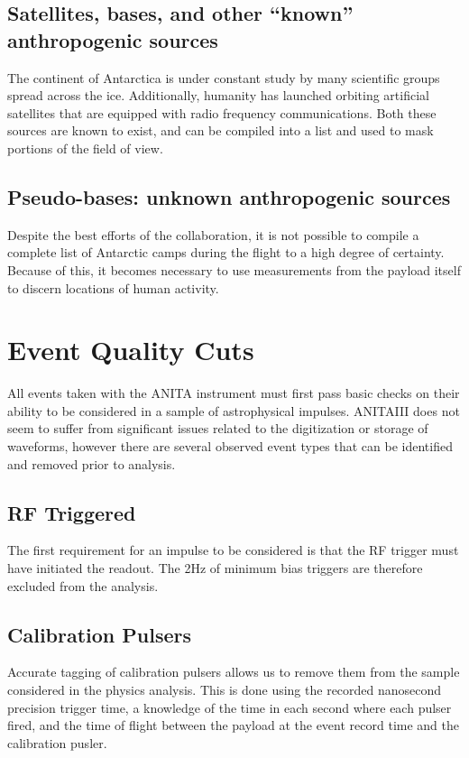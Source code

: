 	\subsection{Satellites, bases, and other ``known'' anthropogenic sources}
		The continent of Antarctica is under constant study by many scientific groups spread across the ice.  Additionally, humanity has launched orbiting artificial satellites that are equipped with radio frequency communications.  Both these sources are known to exist, and can be compiled into a list and used to mask portions of the field of view.  

	\subsection{Pseudo-bases: unknown anthropogenic sources}
		Despite the best efforts of the collaboration, it is not possible to compile a complete list of Antarctic camps during the flight to a high degree of certainty.  Because of this, it becomes necessary to use measurements from the payload itself to discern locations of human activity.  


	
\section{Event Quality Cuts}%
	All events taken with the ANITA instrument must first pass basic checks on their ability to be considered in a sample of astrophysical impulses.  ANITAIII does not seem to suffer from significant issues related to the digitization or storage of waveforms, however there are several observed event types that can be identified and removed prior to analysis.

	\subsection{RF Triggered}
		The first requirement for an impulse to be considered is that the RF trigger must have initiated the readout.  The 2Hz of minimum bias triggers are therefore excluded from the analysis.

	\subsection{Calibration Pulsers}
		Accurate tagging of calibration pulsers allows us to remove them from the sample considered in the physics analysis.  This is done using the recorded nanosecond precision trigger time, a knowledge of the time in each second where each pulser fired, and the time of flight between the payload at the event record time and the calibration pusler.
		
